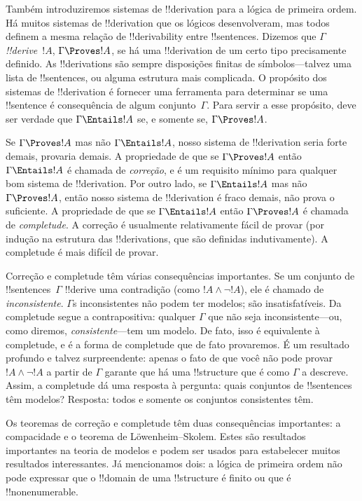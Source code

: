 \documentclass[../../../include/open-logic-section]{subfiles}
\begin{document}


Também introduziremos sistemas de !!{derivation} para a lógica de
primeira ordem.  Há muitos sistemas de !!{derivation} que os lógicos
desenvolveram, mas todos definem a mesma relação de !!{derivability}
entre !!{sentence}s. Dizemos que $\Gamma$ \emph{!!{derive}}~$!A$,
$\Gamma \Proves !A$, se há uma !!{derivation} de um certo tipo
precisamente definido. As !!{derivation}s são sempre disposições
finitas de símbolos---talvez uma lista de !!{sentence}s, ou alguma
estrutura mais complicada.  O propósito dos sistemas de
!!{derivation} é fornecer uma ferramenta para determinar se uma
!!{sentence} é consequência de algum conjunto~$\Gamma$.  Para servir a
esse propósito, deve ser verdade que $\Gamma \Entails !A$ se, e
somente se, $\Gamma \Proves !A$.

Se $\Gamma \Proves !A$ mas não $\Gamma \Entails !A$, nosso sistema de
!!{derivation} seria forte demais, provaria demais.  A propriedade de
que se $\Gamma \Proves !A$ então $\Gamma \Entails !A$ é chamada de
\emph{correção}, e é um requisito mínimo para qualquer bom sistema de
!!{derivation}. Por outro lado, se $\Gamma \Entails !A$ mas não
$\Gamma \Proves !A$, então nosso sistema de !!{derivation} é fraco
demais, não prova o suficiente.  A propriedade de que se $\Gamma
\Entails !A$ então $\Gamma \Proves !A$ é chamada de
\emph{completude}. A correção é usualmente relativamente fácil de
provar (por indução na estrutura das !!{derivation}s, que são
definidas indutivamente). A completude é mais difícil de provar.

Correção e completude têm várias consequências importantes. Se um
conjunto de !!{sentence}s~$\Gamma$ !!{derive} uma contradição (como
$!A \land \lnot !A$), ele é chamado de \emph{inconsistente}.
$\Gamma$s inconsistentes não podem ter modelos; são insatisfatíveis. Da
completude segue a contrapositiva: qualquer $\Gamma$ que não seja
inconsistente---ou, como diremos, \emph{consistente}---tem um modelo.
De fato, isso é equivalente à completude, e é a forma de completude que
de fato provaremos.  É um resultado profundo e talvez surpreendente:
apenas o fato de que você não pode provar $!A \land \lnot !A$ a partir
de $\Gamma$ garante que há uma !!{structure} que é como $\Gamma$ a
descreve.  Assim, a completude dá uma resposta à pergunta: quais
conjuntos de !!{sentence}s têm modelos? Resposta: todos e somente os
conjuntos consistentes têm.

Os teoremas de correção e completude têm duas consequências
importantes: a compacidade e o teorema de L\"owenheim--Skolem. Estes
são resultados importantes na teoria de modelos e podem ser usados
para estabelecer muitos resultados interessantes. Já mencionamos dois:
a lógica de primeira ordem não pode expressar que o !!{domain} de uma
!!{structure} é finito ou que é !!{nonenumerable}.
\end{document}
